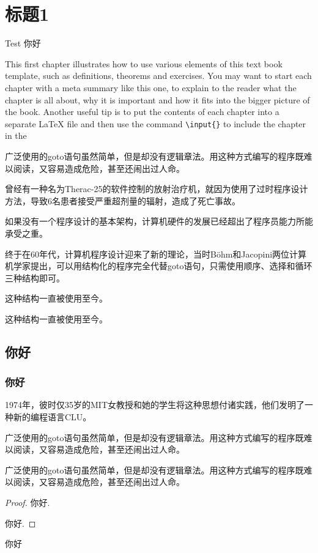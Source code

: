 \documentclass[custom]{linearbook}
\begin{document}
\section{标题1}
Test 你好

  This first chapter illustrates how to use various elements of this
  text book template, such as definitions, theorems and exercises. You
  may want to start each chapter with a meta summary like this one, to
  explain to the reader what the chapter is all about, why it is
  important and how it fits into the bigger picture of the
  book. Another useful tip is to put the contents of each chapter into
  a separate \LaTeX{} file and then use the command
  \texttt{\textbackslash{}input\{\}} to include the chapter in the

  广泛使用的goto语句虽然简单，但是却没有逻辑章法。用这种方式编写的程序既难以阅读，又容易造成危险，甚至还闹出过人命。

曾经有一种名为Therac-25的软件控制的放射治疗机，就因为使用了过时程序设计方法，导致6名患者接受严重超剂量的辐射，造成了死亡事故。

\lbline

如果没有一个程序设计的基本架构，计算机硬件的发展已经超出了程序员能力所能承受之重。%

终于在60年代，计算机程序设计迎来了新的理论，当时Böhm和Jacopini两位计算机学家提出，可以用结构化的程序完全代替goto语句，只需使用顺序、选择和循环三种结构即可。

这种结构一直被使用至今。
\begin{example}
这种结构一直被使用至今。
\end{example}

\subsection{你好}


\subsubsection{你好}
1974年，彼时仅35岁的MIT女教授和她的学生将这种思想付诸实践，他们发明了一种新的编程语言CLU。

广泛使用的goto语句虽然简单，但是却没有逻辑章法。用这种方式编写的程序既难以阅读，又容易造成危险，甚至还闹出过人命。
\begin{theorem}
  广泛使用的goto语句虽然简单，但是却没有逻辑章法。用这种方式编写的程序既难以阅读，又容易造成危险，甚至还闹出过人命。

\end{theorem}
\begin{proof}
  你好.

  你好.
\end{proof}你好
\end{document}
